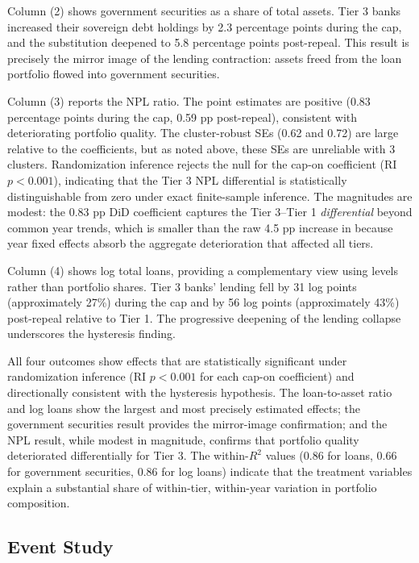 \documentclass[12pt]{article}
\begin{document}
Column (2) shows government securities as a share of total assets. Tier 3 banks increased their sovereign debt holdings by 2.3 percentage points during the cap, and the substitution deepened to 5.8 percentage points post-repeal. This result is precisely the mirror image of the lending contraction: assets freed from the loan portfolio flowed into government securities.

Column (3) reports the NPL ratio. The point estimates are positive (0.83 percentage points during the cap, 0.59 pp post-repeal), consistent with deteriorating portfolio quality. The cluster-robust SEs (0.62 and 0.72) are large relative to the coefficients, but as noted above, these SEs are unreliable with 3 clusters. Randomization inference rejects the null for the cap-on coefficient (RI $p < 0.001$), indicating that the Tier 3 NPL differential is statistically distinguishable from zero under exact finite-sample inference. The magnitudes are modest: the 0.83 pp DiD coefficient captures the Tier 3--Tier 1 \textit{differential} beyond common year trends, which is smaller than the raw 4.5 pp increase in  because year fixed effects absorb the aggregate deterioration that affected all tiers.

Column (4) shows log total loans, providing a complementary view using levels rather than portfolio shares. Tier 3 banks' lending fell by 31 log points (approximately 27\%) during the cap and by 56 log points (approximately 43\%) post-repeal relative to Tier 1. The progressive deepening of the lending collapse underscores the hysteresis finding.



All four outcomes show effects that are statistically significant under randomization inference (RI $p < 0.001$ for each cap-on coefficient) and directionally consistent with the hysteresis hypothesis. The loan-to-asset ratio and log loans show the largest and most precisely estimated effects; the government securities result provides the mirror-image confirmation; and the NPL result, while modest in magnitude, confirms that portfolio quality deteriorated differentially for Tier 3. The within-$R^2$ values (0.86 for loans, 0.66 for government securities, 0.86 for log loans) indicate that the treatment variables explain a substantial share of within-tier, within-year variation in portfolio composition.

\subsection{Event Study}
\end{document}
